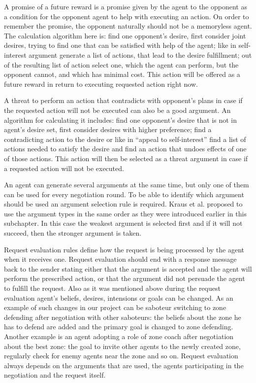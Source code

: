 A promise of a future reward is a promise given by the agent to the opponent as a condition for the opponent agent to help with executing an action. On order to remember the promise, the opponent naturally should not be a memoryless agent. The calculation algorithm here is: find one opponent's desire, first consider joint desires, trying to find one that can be satisfied with help of the agent; like in self-interest argument generate a list of actions, that lead to the desire fulfillment; out of the resulting list of action select one, which the agent can perform, but the opponent cannot, and which has minimal cost. This action will be offered as a future reward in return to executing requested action right now.

A threat to perform an action that contradicts with opponent's plans in case if the requested action will not be executed can also be a good argument. An algorithm for calculating it includes: find one opponent's desire that is not in agent's desire set, first consider desires with higher preference; find a contradicting action to the desire or like in ``appeal to self-interest'' find a list of actions needed to satisfy the desire and find an action that undoes effects of one of those actions. This action will then be selected as a threat argument in case if a requested action will not be executed.

An agent can generate several arguments at the same time, but only one of them can be used for every negotiation round. To be able to identify which argument should be used an argument selection rule is required. Kraus et al. \cite{Kraus_98} proposed to use the argument types in the same order as they were introduced earlier in this subchapter. In this case the weakest argument is selected first and if it will not succeed, then the stronger argument is taken.

Request evaluation rules define how the request is being processed by the agent when it receives one. Request evaluation should end with a response message back to the sender stating either that the argument is accepted and the agent will perform the prescribed action, or that the argument did not persuade the agent to fulfill the request. Also as it was mentioned above during the request evaluation agent's beliefs, desires, intensions or goals can be changed. As an example of such changes in our project can be saboteur switching to zone defending after negotiation with other saboteurs: the beliefs about the zone he has to defend are added and the primary goal is changed to zone defending. Another example is an agent adopting a role of zone coach after negotiation about the best zone: the goal to invite other agents to the newly created zone, regularly check for enemy agents near the zone and so on. Request evaluation always depends on the arguments that are used, the agents participating in the negotiation and the request itself.

